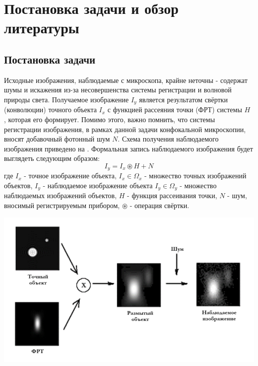 \chapter{Постановка задачи и обзор литературы} \label{ch1}
\section{Постановка задачи} \label{ch1:sec1}
\par Исходные изображения, наблюдаемые с микроскопа, крайне неточны - содержат шумы и искажения из-за несовершенства системы регистрации и волновой природы света. Получаемое изображение $I_y$ является результатом свёртки (конволюции) точного объекта $I_x$ с функцией рассеяния точки (ФРТ) системы $H$ , которая его формирует. \cite{Sibarita2005} Помимо этого, важно помнить, что системы регистрации изображения, в рамках данной задачи конфокальной микроскопии, вносят добавочный фотонный шум $N$. Схема получения наблюдаемого изображения приведено на . Формальная запись наблюдаемого изображения будет выглядеть следующим образом:
\begin{equation}\label{eq:problem}
	I_y = I_x \circledast H + N
\end{equation}
где $I_x$ - точное изображение объекта, $I_x \in \Omega_x$ - множество точных изображений объектов, $I_y$ - наблюдаемое изображение объекта $I_y \in \Omega_y$ - множество наблюдаемых изображений объектов, $H$ - функция рассеивания точки, $N$ - шум, вносимый регистрируемым прибором, $\circledast$ - операция свёртки.
\begin{minipage}{\textwidth}
	\centering
	\vspace{\mfloatsep} %
	\includegraphics[keepaspectratio=true,scale=0.55] {my_folder/images/problem/start.png}
	\label{fig:problem-start}  
	\vspace{\mfloatsep} %
\end{minipage}

